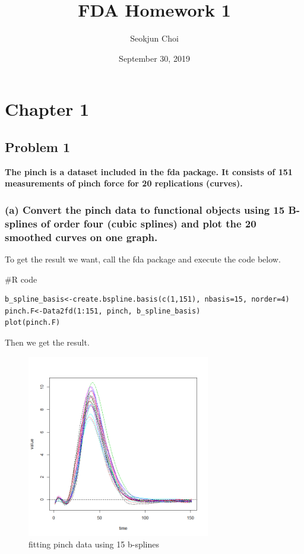 \documentclass{article}
\newenvironment{Rcode}%
{%
    \begin{mdframed}
    \#R code
    \begin{small}
}
{%
    \end{small}
    \end{mdframed}
}
\begin{document}
\title{FDA Homework 1}
\author{Seokjun Choi}
\date{September 30, 2019}
\maketitle

\section{Chapter 1}
\subsection{Problem 1}

\textbf{
The pinch is a dataset included in the fda package. It consists of 151 measurements of pinch force for 20 replications (curves). 
}
\subsubsection*{(a)  Convert the pinch data to functional objects using 15 B-splines of order four (cubic splines) and plot the 20 smoothed curves on one graph.}
To get the result we want, call the fda package and execute the code below.

\begin{Rcode}
    \begin{verbatim}
b_spline_basis<-create.bspline.basis(c(1,151), nbasis=15, norder=4)
pinch.F<-Data2fd(1:151, pinch, b_spline_basis)
plot(pinch.F)
    \end{verbatim}
\end{Rcode}
Then we get the result.
\begin{figure}[hh]
    \centering
    \includegraphics[height=8cm]{pinch_F_plot.png}
    \caption{fitting pinch data using 15 b-splines}
\end{figure}
\end{document}

